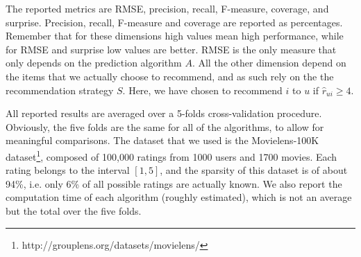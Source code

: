 The reported metrics are RMSE, precision, recall, F-measure, coverage, and
surprise. Precision, recall, F-measure and coverage  are reported as
percentages. Remember that for these dimensions high values mean high
performance, while for RMSE and surprise low values are better.  RMSE is the
only measure that only depends on the prediction algorithm $A$. All the other
dimension depend on the items that we actually choose to recommend, and as such
rely on the the recommendation strategy $S$. Here, we have chosen to
recommend $i$ to $u$ if $\hat{r}_{ui} \geq 4$.

All reported results are averaged over a 5-folds cross-validation
procedure. Obviously, the five folds are the same for all of the algorithms,
to allow for meaningful comparisons.  The dataset that we used is the
Movielens-100K dataset\footnote{http://grouplens.org/datasets/movielens/},
composed of 100,000 ratings from 1000 users and 1700 movies. Each rating
belongs to the interval $[1, 5]$, and the sparsity of this dataset is of about
94\%, i.e. only 6\% of all possible ratings are actually known. We also
report the computation time of each algorithm (roughly estimated), which is not
an average but the total over the five folds.

